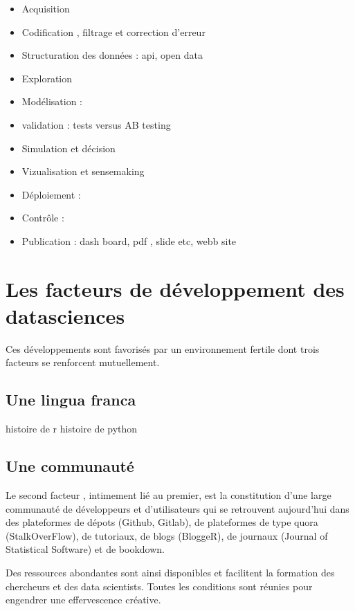 \documentclass[
]{book}
\providecommand{\tightlist}{%
  \setlength{\itemsep}{0pt}\setlength{\parskip}{0pt}}
\begin{document}
\begin{itemize}
\tightlist
\item
  Acquisition
\item
  Codification , filtrage et correction d'erreur
\item
  Structuration des données : api, open data
\item
  Exploration
\item
  Modélisation :
\item
  validation : tests versus AB testing
\item
  Simulation et décision
\item
  Vizualisation et sensemaking
\item
  Déploiement :
\item
  Contrôle :
\item
  Publication : dash board, pdf , slide etc, webb site
\end{itemize}

\hypertarget{les-facteurs-de-duxe9veloppement-des-datasciences}{%
\section{Les facteurs de développement des datasciences}\label{les-facteurs-de-duxe9veloppement-des-datasciences}}

Ces développements sont favorisés par un environnement fertile dont trois facteurs se renforcent mutuellement.

\hypertarget{une-lingua-franca}{%
\subsection{Une lingua franca}\label{une-lingua-franca}}

histoire de r
histoire de python

\hypertarget{une-communautuxe9}{%
\subsection{Une communauté}\label{une-communautuxe9}}

Le second facteur , intimement lié au premier, est la constitution d'une large communauté de développeurs et d'utilisateurs qui se retrouvent aujourd'hui dans des plateformes de dépots (Github, Gitlab), de plateformes de type quora (StalkOverFlow), de tutoriaux, de blogs (BloggeR), de journaux (Journal of Statistical Software) et de bookdown.

Des ressources abondantes sont ainsi disponibles et facilitent la formation des chercheurs et des data scientists. Toutes les conditions sont réunies pour engendrer une effervescence créative.
\end{document}

